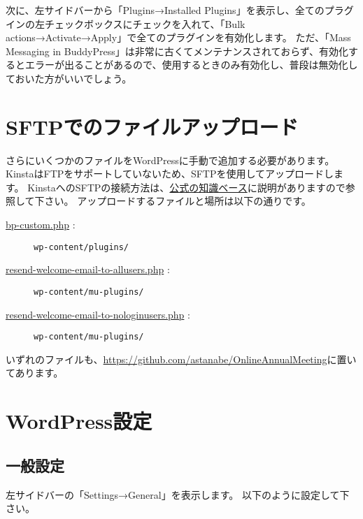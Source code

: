 \documentclass[titlepage,10pt,a4paper,uplatex]{jsbook}
\begin{document}
次に、左サイドバーから「Plugins→Installed Plugins」を表示し、全てのプラグインの左チェックボックスにチェックを入れて、「Bulk actions→Activate→Apply」で全てのプラグインを有効化します。
ただ、「Mass Messaging in BuddyPress」は非常に古くてメンテナンスされておらず、有効化するとエラーが出ることがあるので、使用するときのみ有効化し、普段は無効化しておいた方がいいでしょう。

\section{SFTPでのファイルアップロード}

さらにいくつかのファイルをWordPressに手動で追加する必要があります。
KinstaはFTPをサポートしていないため、SFTPを使用してアップロードします。
KinstaへのSFTPの接続方法は、\href{https://kinsta.com/jp/knowledgebase/how-to-use-sftp/}{公式の知識ベース}に説明がありますので参照して下さい。
アップロードするファイルと場所は以下の通りです。

\begin{description}
\item[\href{https://github.com/astanabe/OnlineAnnualMeeting/blob/main/bp-custom.php}{bp-custom.php} : ] \texttt{wp-content/plugins/}
\item[\href{https://github.com/astanabe/OnlineAnnualMeeting/blob/main/resend-welcome-email-to-allusers.php}{resend-welcome-email-to-allusers.php} : ] \texttt{wp-content/mu-plugins/}
\item[\href{https://github.com/astanabe/OnlineAnnualMeeting/blob/main/resend-welcome-email-to-nologinusers.php}{resend-welcome-email-to-nologinusers.php} : ] \texttt{wp-content/mu-plugins/}
\end{description}

いずれのファイルも、\url{https://github.com/astanabe/OnlineAnnualMeeting}に置いてあります。

\section{WordPress設定}

\subsection{一般設定}

左サイドバーの「Settings→General」を表示します。
以下のように設定して下さい。
\end{document}
